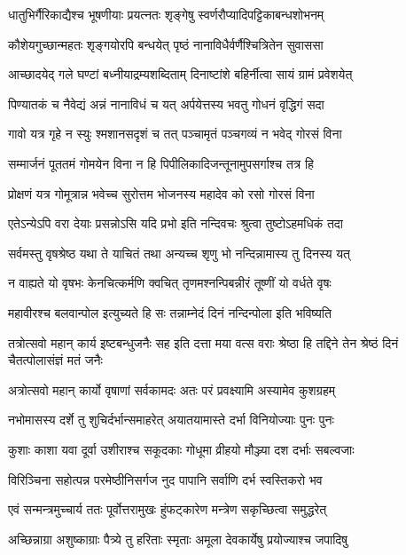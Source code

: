 \twolineshloka
{धातुभिर्गैरिकाद्यैश्च भूषणीयाः प्रयत्नतः}
{शृङ्गेषु स्वर्णरौप्यादिपट्टिकाबन्धशोभनम्} %

\twolineshloka
{कौशेयगुच्छान्महतः शृङ्गयोरपि बन्धयेत्}
{पृष्ठं नानाविधैर्वर्णैश्चित्रितेन सुवाससा} %

\twolineshloka
{आच्छादयेद् गले घण्टां बध्नीयाद्रम्यशब्दिताम्}
{दिनाष्टांशे बहिर्नीत्वा सायं ग्रामं प्रवेशयेत्} %

\twolineshloka
{पिण्यातकं च नैवेद्यं अन्नं नानाविधं च यत्}
{अर्पयेत्तस्य भवतु गोधनं वृद्धिगं सदा} %

\twolineshloka
{गावो यत्र गृहे न स्युः श्मशानसदृशं च तत्}
{पञ्चामृतं पञ्चगव्यं न भवेद् गोरसं विना} %

\twolineshloka
{सम्मार्जनं पूततमं गोमयेन विना न हि}
{पिपीलिकादिजन्तूनामुपसर्गाश्च तत्र हि} %

\twolineshloka
{प्रोक्षणं यत्र गोमूत्रान्न भवेच्च सुरोत्तम}
{भोजनस्य महादेव को रसो गोरसं विना} %

\twolineshloka
{एतेऽन्येऽपि वरा देयाः प्रसन्नोऽसि यदि प्रभो}
{इति नन्दिवचः श्रुत्वा तुष्टोऽहमधिकं तदा} %

\twolineshloka
{सर्वमस्तु वृषश्रेष्ठ यथा ते याचितं तथा}
{अन्यच्च शृणु भो नन्दिन्नामास्य तु दिनस्य यत्} %

\twolineshloka
{न वाह्यते यो वृषभः केनचित्कर्मणि क्वचित्}
{तृणमश्नन्पिबन्नीरं तूष्णीं यो वर्धते वृषः} %

\twolineshloka
{महावीरश्च बलवान्पोल इत्युच्यते हि सः}
{तन्नाम्नेदं दिनं नन्दिन्पोला इति भविष्यति} %


\threelineshloka
{तत्रोत्सवो महान् कार्य इष्टबन्धुजनैः सह}
{इति दत्ता मया वत्स वराः श्रेष्ठा हि तद्दिने}
{तेन श्रेष्ठं दिनं चैतत्पोलासंज्ञं मतं जनैः} %

\twolineshloka
{अत्रोत्सवो महान् कार्यो वृषाणां सर्वकामदः}
{अतः परं प्रवक्ष्यामि अस्यामेव कुशग्रहम्} %

\twolineshloka
{नभोमासस्य दर्शे तु शुचिर्दर्भान्समाहरेत्}
{अयातयामास्ते दर्भा विनियोज्याः पुनः पुनः} %

\twolineshloka
{कुशाः काशा यवा दूर्वा उशीराश्च सकूदकाः}
{गोधूमा व्रीहयो मौञ्ज्या दश दर्भाः सबल्वजाः} %

\twolineshloka
{विरिञ्चिना सहोत्पन्न परमेष्ठीनिसर्गज}
{नुद पापानि सर्वाणि दर्भ स्वस्तिकरो भव} %

\twolineshloka
{एवं सन्मन्त्रमुच्चार्य ततः पूर्वोत्तरामुखः}
{हुंफट्कारेण मन्त्रेण सकृच्छित्वा समुद्धरेत्} %

\twolineshloka
{अच्छिन्नाग्रा अशुष्काग्राः पैत्र्ये तु हरिताः स्मृताः}
{अमूला देवकार्येषु प्रयोज्याश्च जपादिषु} %

